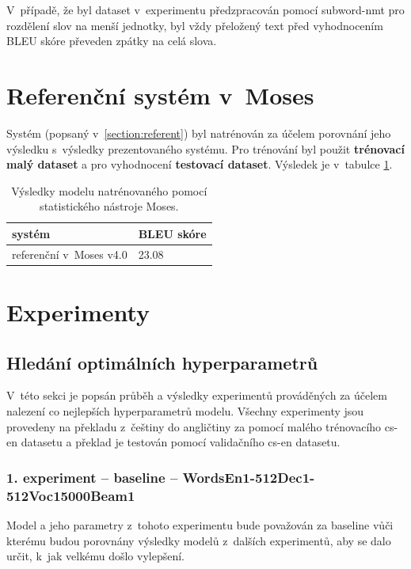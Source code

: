 V~případě, že byl dataset v~experimentu předzpracován pomocí subword-nmt pro rozdělení slov na menší jednotky, byl vždy přeložený text před vyhodnocením BLEU skóre převeden zpátky na celá slova.

\section{Referenční systém v~Moses}
Systém (popsaný v~\ref{section:referent}) byl natrénován za účelem porovnání jeho výsledku s~výsledky prezentovaného systému. Pro trénování byl použit \textbf{trénovací malý dataset} a pro vyhodnocení \textbf{testovací dataset}. Výsledek je v~tabulce \ref{table:referent}.

\begin{table}[H]
    \begin{center}
        \begin{tabular}{ll}
          \toprule
          systém & BLEU skóre  \\
          \midrule
          referenční v~Moses v4.0 & 23.08\\
          \bottomrule
        \end{tabular}
    \end{center}
	\caption{Výsledky modelu natrénovaného pomocí statistického nástroje Moses.}
	\label{table:referent}
\end{table}

\section{Experimenty}

\subsection{Hledání optimálních hyperparametrů}\label{subsection:experimentsOptimal}
V~této sekci je popsán průběh a výsledky experimentů prováděných za účelem nalezení co nejlepších hyperparametrů modelu. Všechny experimenty jsou provedeny na překladu z~češtiny do angličtiny za pomocí malého trénovacího cs-en datasetu a překlad je testován pomocí validačního cs-en datasetu.

\subsubsection{1. experiment -- baseline -- WordsEn1-512Dec1-512Voc15000Beam1}\label{experiment1}
Model a jeho parametry z~tohoto experimentu bude považován za baseline vůči kterému budou porovnány výsledky modelů z~dalších experimentů, aby se dalo určit, k~jak velkému došlo vylepšení.


